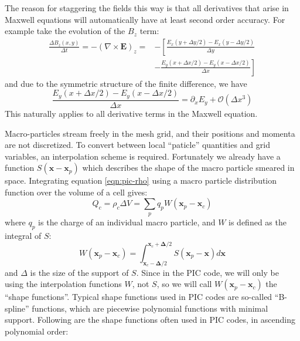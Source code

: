The reason for staggering the fields this way is that all derivatives that arise
in Maxwell equations will automatically have at least second order accuracy. For
example take the evolution of the $B_z$ term:
\begin{equation}
  \begin{split}
    \frac{\Delta B_z(x, y)}{\Delta t} = -(\nabla\times \mathbf{E})_{z} = &-\left[ \frac{E_x(y + \Delta y/2) - E_x(y - \Delta y/2)}{\Delta y} \right. \\
      &- \left.\frac{E_y(x + \Delta x/2) - E_y(x - \Delta x/2)}{\Delta x} \right]
  \end{split}
\end{equation}
and due to the symmetric structure of the finite difference, we have
\begin{equation}
\frac{E_y(x + \Delta x/2) - E_y(x - \Delta x/2)}{\Delta x} = \partial_xE_y + \mathcal{O}(\Delta x^3)
\end{equation}
This naturally applies to all derivative terms in the Maxwell equation.

Macro-particles stream freely in the mesh grid, and their positions and momenta
are not discretized. To convert between local ``paticle'' quantities and grid
variables, an interpolation scheme is required. Fortunately we already have a
function $S(\mathbf{x} - \mathbf{x}_p)$ which describes the shape of the macro
particle smeared in space. Integrating equation \eqref{eqn:pic-rho} using a
macro particle distribution function over the volume of a cell gives:
\begin{equation}
  \label{eqn:rho-cell}
  Q_{c} = \rho_{c}\Delta V = \sum_pq_pW(\mathbf{x}_p-\mathbf{x}_{c})
\end{equation}
where $q_p$ is the charge of an individual macro particle, and $W$ is defined as
the integral of $S$:
\begin{equation}
  \label{eqn:weight-function}
  W(\mathbf{x}_p - \mathbf{x}_c) = \int_{\mathbf{x}_c - \mathbf{\Delta}/2}^{\mathbf{x}_c + \mathbf{\Delta}/2} S(\mathbf{x}_p - \mathbf{x})d\mathbf{x}
\end{equation}
and $\Delta$ is the size of the support of $S$. Since in the PIC code,
we will only be using the interpolation functions $W$, not $S$, so we
will call $W(\mathbf{x}_p - \mathbf{x}_c)$ the ``shape
functions''. Typical shape functions used in PIC codes are so-called
``B-spline'' functions, which are piecewise polynomial functions with
minimal support. Following are the shape functions often used in PIC
codes, in ascending polynomial order:

